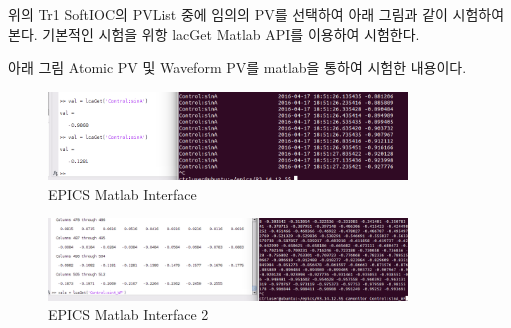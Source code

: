 \documentclass[11pt
  , a4paper
  , article
  , oneside
]{memoir}
\begin{document}
위의 Tr1 SoftIOC의 PVList 중에 임의의 PV를 선택하여 아래 그림과 같이 시험하여본다.
기본적인 시험을 위항 lacGet Matlab API를 이용하여 시험한다.

아래 그림 Atomic PV 및 Waveform PV를 matlab을 통하여 시험한 내용이다.

\begin{figure}[h!]
	\centering
	\includegraphics[width=0.85\textwidth]{./images/LabChannelAccess.png}
	\caption{EPICS Matlab Interface}
	\label{fig:lab_channelaccess} 
\end{figure}


\begin{figure}[h!]
	\centering
	\includegraphics[width=0.85\textwidth]{./images/LabCA_Waveform.png}
	\caption{EPICS Matlab Interface 2}
	\label{fig:lab_channelaccess_2} 
\end{figure}

\clearpage

\clearpage



\end{document}
